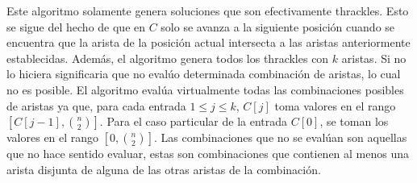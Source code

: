   Este algoritmo solamente genera soluciones que son efectivamente thrackles.
  Esto se sigue del hecho de que en $C$ solo se avanza a la siguiente posición
  cuando se encuentra que la arista de la posición actual intersecta a las
  aristas anteriormente establecidas. Además, el algoritmo genera todos los
  thrackles con $k$ aristas. Si no lo hiciera significaria que no evalúo
  determinada combinación de aristas, lo cual no es posible. El algoritmo
  evalúa virtualmente todas las combinaciones posibles de aristas ya que, para
  cada entrada $1\leq j\leq k$, $C[j]$ toma valores en el rango
  $\left[C[j-1],\binom{n}{2}\right]$. Para el caso particular de la entrada
  $C[0]$, se toman los valores en el rango $\left[ 0, \binom{n}{2}\right]$. Las
  combinaciones que no se evalúan son aquellas que no hace sentido evaluar,
  estas son combinaciones que contienen al menos una arista disjunta de alguna
  de las otras aristas de la combinación.


  \begin{figure}[htpb]
    \centering
\end{figure}

